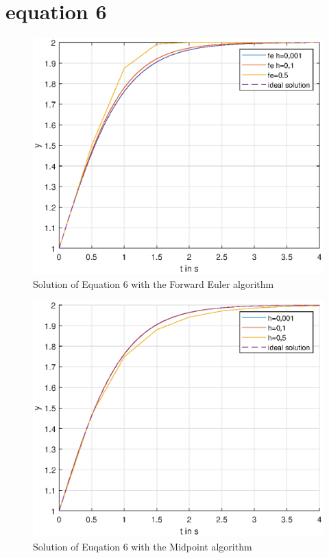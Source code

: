 \section{equation 6}
\begin{figure}[H]
    \centering
    \includegraphics[width=\plotwidth]{plots/fe_only_equation_6.eps}
    \caption{Solution of Equation 6 with the Forward Euler algorithm}
    \label{fig:eq6_fe_only}
\end{figure}

\begin{figure}[H]
    \centering
    \includegraphics[width=\plotwidth]{plots/rk_only_equation_6.eps}
    \caption{Solution of Euqation 6 with the Midpoint algorithm}
    \label{fig:eq6_rk_only}
\end{figure}